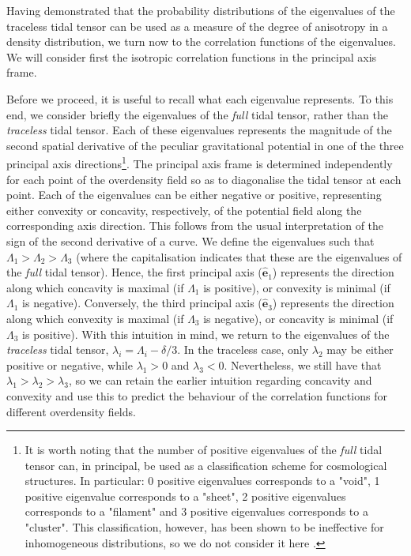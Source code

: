 \documentclass[a4paper,11pt]{article}
\begin{document}
Having demonstrated that the probability distributions of the eigenvalues of the traceless tidal tensor can be used as a measure of the degree of anisotropy in a density distribution, we turn now to the correlation functions of the eigenvalues. We will consider first the isotropic correlation functions in the principal axis frame. 

Before we proceed, it is useful to recall what each eigenvalue represents. To this end, we consider briefly the eigenvalues of the \textit{full} tidal tensor, rather than the \textit{traceless} tidal tensor. Each of these eigenvalues represents the magnitude of the second spatial derivative of the peculiar gravitational potential in one of the three principal axis directions\footnote{It is worth noting that the number of positive eigenvalues of the \textit{full} tidal tensor can, in principal, be used as a classification scheme for cosmological structures. In particular: 0 positive eigenvalues corresponds to a "void", 1 positive eigenvalue corresponds to a "sheet", 2 positive eigenvalues corresponds to a "filament" and 3 positive eigenvalues corresponds to a "cluster". This classification, however, has been shown to be ineffective for inhomogeneous distributions, so we do not consider it here \cite{2016MNRAS.457.2501F}.  
}. The principal axis frame is determined independently for each point of the overdensity field so as to diagonalise the tidal tensor at each point. Each of the eigenvalues can be either negative or positive, representing either convexity or concavity, respectively, of the potential field along the corresponding axis direction. This follows from the usual interpretation of the sign of the second derivative of a curve. We define the eigenvalues such that $\Lambda_1 > \Lambda_2 > \Lambda_3$ (where the capitalisation indicates that these are the eigenvalues of the \textit{full} tidal tensor). Hence, the first principal axis ($\hat{\mathbf{e}}_1$) represents the direction along which concavity is maximal (if $\Lambda_1$ is positive), or convexity is minimal (if $\Lambda_1$ is negative). Conversely, the third principal axis ($\hat{\mathbf{e}}_3$) represents the direction along which convexity is maximal (if $\Lambda_3$ is negative), or concavity is minimal (if $\Lambda_3$ is positive). With this intuition in mind, we return to the eigenvalues of the \textit{traceless} tidal tensor, $\lambda_i = \Lambda_i - \delta/3$. In the traceless case, only $\lambda_2$ may be either positive or negative, while $\lambda_1 > 0$ and $\lambda_3 < 0$. Nevertheless, we still have that $\lambda_1 > \lambda_2 > \lambda_3$, so we can retain the earlier intuition regarding concavity and convexity and use this to predict the behaviour of the correlation functions for different overdensity fields. 
\end{document}
